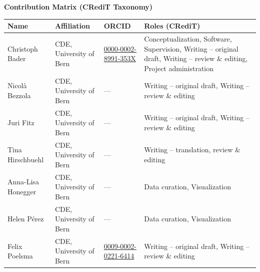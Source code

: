 \documentclass[
  a4paper,
  DIV=11,
  numbers=noendperiod,
  oneside,
  openany]{scrreprt}
\newcounter{none} %
\begin{document}
\begin{tcolorbox}[enhanced jigsaw, arc=.35mm, bottomrule=.15mm, breakable, colback=white, colframe=quarto-callout-note-color-frame, left=2mm, leftrule=.75mm, opacityback=0, rightrule=.15mm, toprule=.15mm]

\vspace{-3mm}\textbf{Contribution Matrix (CRediT Taxonomy)}\vspace{3mm}

{\def\LTcaptype{none} %
\begin{longtable}[]{@{}
  >{\raggedright\arraybackslash}p{}
  >{\raggedright\arraybackslash}p{}
  >{\raggedright\arraybackslash}p{}
  >{\raggedright\arraybackslash}p{}@{}}
\toprule\noalign{}
\begin{minipage}[b]{\linewidth}\raggedright
Name
\end{minipage} & \begin{minipage}[b]{\linewidth}\raggedright
Affiliation
\end{minipage} & \begin{minipage}[b]{\linewidth}\raggedright
ORCID
\end{minipage} & \begin{minipage}[b]{\linewidth}\raggedright
Roles (CRediT)
\end{minipage} \\
\midrule\noalign{}
\endhead
\bottomrule\noalign{}
\endlastfoot
Christoph Bader & CDE, University of Bern &
\href{https://orcid.org/0000-0002-8991-353X}{0000-0002-8991-353X} &
Conceptualization, Software, Supervision, Writing -- original draft,
Writing -- review \& editing, Project administration \\
Nicolà Bezzola & CDE, University of Bern & --- & Writing -- original
draft, Writing -- review \& editing \\
Juri Fitz & CDE, University of Bern & --- & Writing -- original draft,
Writing -- review \& editing \\
Tina Hirschbuehl & CDE, University of Bern & --- & Writing --
translation, review \& editing \\
Anna-Lisa Honegger & CDE, University of Bern & --- & Data curation,
Visualization \\
Helen Pérez & CDE, University of Bern & --- & Data curation,
Visualization \\
Felix Poelsma & CDE, University of Bern &
\href{https://orcid.org/0009-0002-0221-6414}{0009-0002-0221-6414} &
Writing -- original draft, Writing -- review \& editing \\
\end{longtable}
}

\end{tcolorbox}
\end{document}
